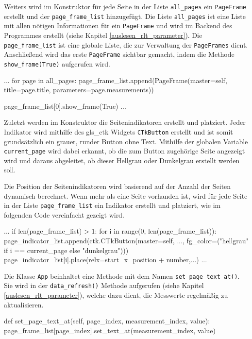 Weiters wird im Konstruktor für jede Seite in der Liste \lstinline{all_pages} ein \lstinline{PageFrame} erstellt und der \lstinline{page_frame_list} hinzugefügt. Die Liste \lstinline{all_pages} ist eine Liste mit allen nötigen Informationen für ein \lstinline{PageFrame} und wird im Backend des Programmes erstellt (siehe Kapitel \ref{auslesen_rlt_parameter}). Die \lstinline{page_frame_list} ist eine globale Liste, die zur Verwaltung der \lstinline{PageFrames} dient. Anschließend wird das erste \lstinline{PageFrame} sichtbar gemacht, indem die Methode \lstinline{show_frame(True)} aufgerufen wird.

\begin{pythoncode}
...	
		for page in all_pages:
			page_frame_list.append(PageFrame(master=self, title=page.title, parameters=page.measurements))
   
		page_frame_list[0].show_frame(True)
...
\end{pythoncode}

Zuletzt werden im Konstruktor die Seitenindikatoren erstellt und platziert. Jeder Indikator wird mithilfe des \gls{gls_ctk} Widgets \lstinline{CTkButton} erstellt und ist somit grundsätzlich ein grauer, runder Button ohne Text. Mithilfe der globalen Variable \lstinline{current_page} wird dabei erkannt, ob die zum Button zugehörige Seite angezeigt wird und daraus abgeleitet, ob dieser Hellgrau oder Dunkelgrau erstellt werden soll.

Die Position der Seitenindikatoren wird basierend auf der Anzahl der Seiten dynamisch berechnet. Wenn mehr als eine Seite vorhanden ist, wird für jede Seite in der Liste \lstinline{page_frame_list} ein Indikator erstellt und platziert, wie im folgenden Code vereinfacht gezeigt wird.

\begin{pythoncode}
...
		if len(page_frame_list) > 1:
			for i in range(0, len(page_frame_list)):
				page_indicator_list.append(ctk.CTkButton(master=self, ..., fg_color=("hellgrau" if i == current_page else "dunkelgrau")))
				page_indicator_list[i].place(relx=start_x_position + number,...)
...
\end{pythoncode}

Die Klasse \lstinline{App} beinhaltet eine Methode mit dem Namen \lstinline{set_page_text_at()}. Sie wird in der \lstinline{data_refresh()} Methode aufgerufen (siehe Kapitel \ref{auslesen_rlt_parameter}), welche dazu dient, die Messwerte regelmäßig zu aktualisieren.

\begin{pythoncode}
	def set_page_text_at(self, page_index, measurement_index, value):
    	page_frame_list[page_index].set_text_at(measurement_index, value)
\end{pythoncode}

